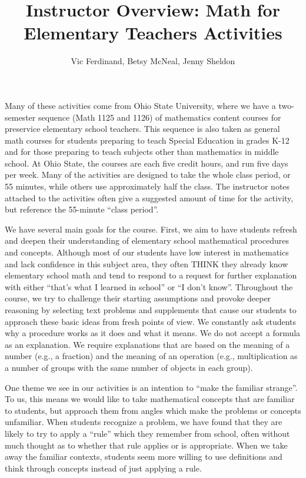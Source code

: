\documentclass{ximera}
\title{Instructor Overview: Math for Elementary Teachers Activities}
\author{Vic Ferdinand, Betsy McNeal, Jenny Sheldon}
\begin{document}
\begin{abstract}\end{abstract}\maketitle

Many of these activities come from Ohio State University, where we have a two-semester sequence 
(Math 1125 and 1126) of mathematics content courses for preservice elementary school teachers.  This sequence is
also taken as general math courses for students preparing 
to teach Special Education in grades K-12 and for those preparing to teach subjects other than 
mathematics in middle school.  At Ohio State, the courses are each five credit 
hours, and run five days per week.  Many of the activities are designed to take the whole class 
period, or 55 minutes, while others use approximately half the class.  
The instructor notes attached to the activities often give a suggested amount of time for the 
activity, but reference the 55-minute ``class period''.

We have several main goals for the course.  First, we aim to have students refresh and deepen their 
understanding of elementary school mathematical procedures and concepts.  Although most of our 
students have low interest in mathematics and lack confidence in this subject area, they often 
THINK they already know elementary school math and tend to respond to a request 
for further explanation with either ``that's what I learned in school'' or ``I don't know''.  Throughout the 
course, we try to challenge their starting assumptions and provoke deeper reasoning by selecting 
text problems and supplements that cause our students to approach these basic ideas from fresh 
points of view.  We constantly ask students why a procedure works as it does and what it 
means.  We do not accept a formula as an explanation.  We require explanations that are
based on the meaning of a number (e.g., a fraction) and the meaning of an operation (e.g., 
multiplication as a number of groups with the same number of objects in each group).

One theme we see in our activities is an intention to ``make the familiar strange''.  To us, this means 
we would like to take mathematical concepts that are familiar to students, but approach them from 
angles which make the problems or concepts unfamiliar.  When students recognize a problem, we have 
found that they are likely to try to apply a ``rule'' which they remember from school, often 
without much thought as to whether that rule applies or is appropriate.  When we take away the 
familiar contexts, students seem more willing to use definitions and think through concepts instead
of just applying a rule.
\end{document}
